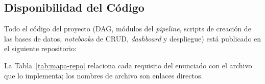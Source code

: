 \subsection*{Disponibilidad del Código}

Todo el código del proyecto (DAG, módulos del \textit{pipeline}, scripts de creación de las bases de datos, \textit{notebooks} de CRUD, \textit{dashboard} y despliegue) está publicado en el siguiente repositorio:

\begin{center}
\end{center}

La Tabla~\ref{tab:mapa-repo} relaciona cada requisito del enunciado con el archivo que lo implementa; los nombres de archivo son enlaces directos.

